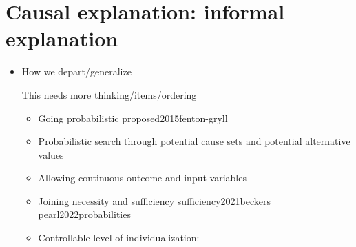 \documentclass{article}
\begin{document}
\section{Causal explanation: informal explanation}

\begin{itemize}

\item How we depart/generalize 


This needs more thinking/items/ordering



\begin{itemize}

\item Going probabilistic proposed2015fenton-gryll



\item Probabilistic search through potential cause sets and potential alternative values




\item Allowing continuous outcome and input variables






\item Joining necessity and sufficiency   sufficiency2021beckers pearl2022probabilities


\item Controllable level of individualization: 


\end{itemize}
\end{itemize}
\end{document}
